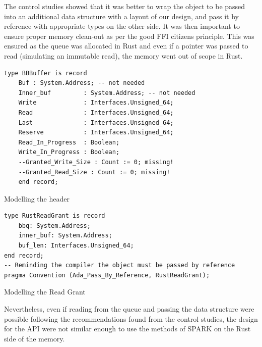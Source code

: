 \documentclass[nomenclature, english, bibtex]{kththesis}
\begin{document}
The control studies showed that it was better to wrap the object to be passed into an additional data structure with a layout of our design, and pass it by reference with appropriate types on the other side. It was then important to ensure proper memory clean-out as per the good FFI citizens principle. This was ensured as the queue was allocated in Rust and even if a pointer was passed to read (simulating an immutable read), the memory went out of scope in Rust.

\begin{listing}[ht!]
\begin{verbatim}
type BBBuffer is record
    Buf : System.Address; -- not needed
    Inner_buf         : System.Address; -- not needed
    Write             : Interfaces.Unsigned_64;
    Read              : Interfaces.Unsigned_64;
    Last              : Interfaces.Unsigned_64;
    Reserve           : Interfaces.Unsigned_64;
    Read_In_Progress  : Boolean;
    Write_In_Progress : Boolean;
    --Granted_Write_Size : Count := 0; missing!
    --Granted_Read_Size : Count := 0; missing!
    end record;
\end{verbatim}
\caption{Modelling the header}
\label{lst:bbqueueheaderinspark}
\end{listing}
\FloatBarrier


\begin{listing}[ht!]
\begin{verbatim}
type RustReadGrant is record
    bbq: System.Address;
    inner_buf: System.Address;
    buf_len: Interfaces.Unsigned_64;
end record;
-- Reminding the compiler the object must be passed by reference
pragma Convention (Ada_Pass_By_Reference, RustReadGrant);
\end{verbatim}
\caption{Modelling the Read Grant}
\label{lst:bbqueuereadgrantinspark}
\end{listing}
\FloatBarrier


Nevertheless, even if reading from the queue and passing the data structure were possible following the recommendations found from the control studies, the design for the API were not similar enough to use the methods of SPARK on the Rust side of the memory.


\cleardoublepage
\end{document}
